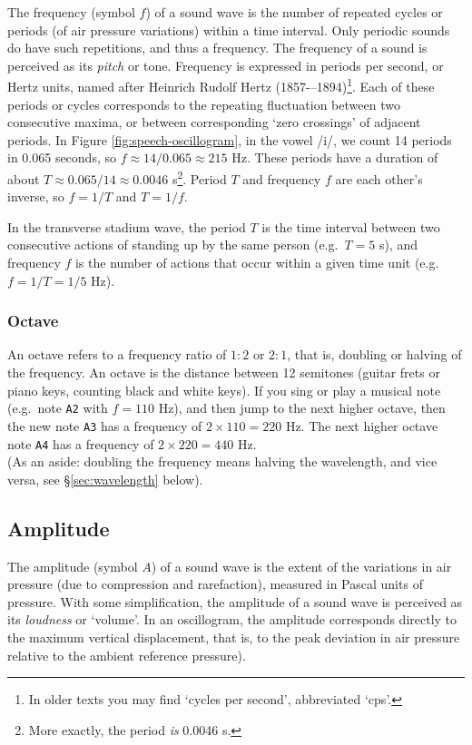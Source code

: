\documentclass[
]{book}
\begin{document}
The frequency (symbol \(f\)) of a sound wave is the number of repeated cycles or periods (of air pressure variations) within a time interval. Only periodic sounds do have such repetitions, and thus a frequency. The frequency of a sound is perceived as its \emph{pitch} or tone. Frequency is expressed in periods per second, or Hertz units, named after Heinrich Rudolf Hertz (1857-\/--1894)\footnote{In older texts you may find `cycles per second', abbreviated `cps'.}.
Each of these periods or cycles corresponds to the repeating fluctuation between two consecutive maxima, or between corresponding `zero crossings' of adjacent periods. In Figure \ref{fig:speech-oscillogram}, in the vowel /i/, we count 14 periods in 0.065 seconds, so \(f \approx 14/0.065 \approx 215\) Hz. These periods have a duration of about \(T \approx 0.065/14 \approx 0.0046\) s\footnote{More exactly, the period \emph{is} 0.0046 s.}. Period \(T\) and frequency \(f\) are each other's inverse, so \(f=1/T\) and \(T=1/f\).

In the transverse stadium wave, the period \(T\) is the time interval between two consecutive actions of standing up by the same person (e.g.~\(T=5\) s), and frequency \(f\) is the number of actions that occur within a given time unit (e.g.~\(f=1/T=1/5\) Hz).

\subsubsection{Octave}\label{sec:octave}

An octave refers to a frequency ratio of \(1:2\) or \(2:1\), that is, doubling or halving of the frequency. An octave is the distance between 12 semitones (guitar frets or piano keys, counting black and white keys). If you sing or play a musical note (e.g.~note \texttt{A2} with \(f=110\) Hz), and then jump to the next higher octave, then the new note \texttt{A3} has a frequency of \(2 \times 110=220\) Hz. The next higher octave note \texttt{A4} has a frequency of \(2 \times 220=440\) Hz.\\
(As an aside: doubling the frequency means halving the wavelength, and vice versa, see §\ref{sec:wavelength} below).

\subsection{Amplitude}\label{sec:amplitude}

The amplitude (symbol \(A\)) of a sound wave is the extent of the variations in air pressure (due to compression and rarefaction), measured in Pascal units of pressure. With some simplification, the amplitude of a sound wave is perceived as its \emph{loudness} or `volume'. In an oscillogram, the amplitude corresponds directly to the maximum vertical displacement, that is, to the peak deviation in air pressure relative to the ambient reference pressure).
\end{document}
